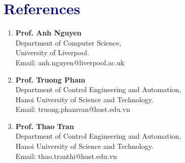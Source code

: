 \documentclass[a4paper,11pt]{article}
\begin{document}
\section{\textcolor{darkblue}{\textbf{References}}}
\vspace{-0.2mm}
\small{
\begin{enumerate}[leftmargin=*,labelsep=2mm]

\item \textbf{Prof. Anh Nguyen}\\
   Department of Computer Science,\\
   University of Liverpool.\\
   Email: anh.nguyen@liverpool.ac.uk\\

\item \textbf{Prof. Truong Pham}\\
   Department of Control Engineering and Automation,\\
   Hanoi University of Science and Technology.\\
   Email: truong.phamvan@hust.edu.vn\\

\item \textbf{Prof. Thao Tran}\\
   Department of Control Engineering and Automation,\\
   Hanoi University of Science and Technology.\\
   Email: thao.tranthi@hust.edu.vn\\


\end{enumerate}
}
\end{document}

